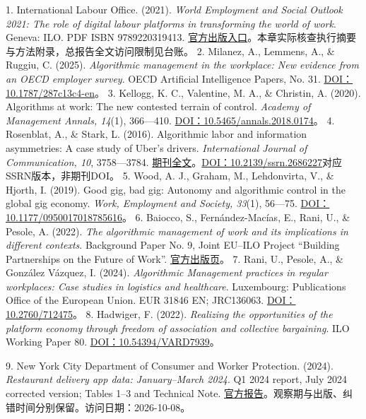 \documentclass[UTF8,fontset=windows,12pt,a4paper,oneside,openany]{ctexbook}
\begin{document}
1. International Labour Office. (2021). \emph{World Employment and Social Outlook 2021: The role of digital labour platforms in transforming the world of work}. Geneva: ILO. PDF ISBN 9789220319413. \href{https://www.ilo.org/publications/flagship-reports/role-digital-labour-platforms-transforming-world-work}{官方出版入口}。本章实际核查执行摘要与方法附录，总报告全文访问限制见台账。
2. Milanez, A., Lemmens, A., \& Ruggiu, C. (2025). \emph{Algorithmic management in the workplace: New evidence from an OECD employer survey}. OECD Artificial Intelligence Papers, No. 31. \href{https://doi.org/10.1787/287c13c4-en}{DOI：10.1787/287c13c4-en}。
3. Kellogg, K. C., Valentine, M. A., \& Christin, A. (2020). Algorithms at work: The new contested terrain of control. \emph{Academy of Management Annals, 14}(1), 366—410. \href{https://doi.org/10.5465/annals.2018.0174}{DOI：10.5465/annals.2018.0174}。
4. Rosenblat, A., \& Stark, L. (2016). Algorithmic labor and information asymmetries: A case study of Uber’s drivers. \emph{International Journal of Communication, 10}, 3758—3784. \href{https://ijoc.org/index.php/ijoc/article/download/4892/1739}{期刊全文}。\href{https://doi.org/10.2139/ssrn.2686227}{DOI：10.2139/ssrn.2686227}对应SSRN版本，非期刊DOI。
5. Wood, A. J., Graham, M., Lehdonvirta, V., \& Hjorth, I. (2019). Good gig, bad gig: Autonomy and algorithmic control in the global gig economy. \emph{Work, Employment and Society, 33}(1), 56—75. \href{https://doi.org/10.1177/0950017018785616}{DOI：10.1177/0950017018785616}。
6. Baiocco, S., Fernández-Macías, E., Rani, U., \& Pesole, A. (2022). \emph{The algorithmic management of work and its implications in different contexts}. Background Paper No. 9, Joint EU–ILO Project “Building Partnerships on the Future of Work”. \href{https://www.ilo.org/publications/algorithmic-management-work-and-its-implications-different-contexts}{官方出版页}。
7. Rani, U., Pesole, A., \& González Vázquez, I. (2024). \emph{Algorithmic Management practices in regular workplaces: Case studies in logistics and healthcare}. Luxembourg: Publications Office of the European Union. EUR 31846 EN; JRC136063. \href{https://doi.org/10.2760/712475}{DOI：10.2760/712475}。
8. Hadwiger, F. (2022). \emph{Realizing the opportunities of the platform economy through freedom of association and collective bargaining}. ILO Working Paper 80. \href{https://doi.org/10.54394/VARD7939}{DOI：10.54394/VARD7939}。

9. New York City Department of Consumer and Worker Protection. (2024). \emph{Restaurant delivery app data: January–March 2024}. Q1 2024 report, July 2024 corrected version; Tables 1–3 and Technical Note. \href{https://www.nyc.gov/assets/dca/downloads/pdf/workers/Restaurant-Delivery-App-Data-Q1-2024.pdf}{官方报告}。观察期与出版、纠错时间分别保留。访问日期：2026-10-08。
\end{document}
